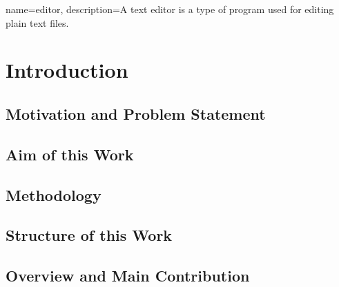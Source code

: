 %
%
%
%



{
  name={editor},
  description={A text editor is a type of program used for editing plain text files.}
}

\chapter{Introduction}
\label{chap:intro}

\section{Motivation and Problem Statement}
\label{sec:motivation}


\section{Aim of this Work}
\label{sec:aim}

\section{Methodology} %
\label{sec:methodology}

\section{Structure of this Work}
\label{sec:structure}

\section{Overview and Main Contribution}
\label{sec:contribution}
